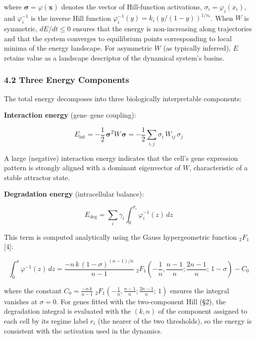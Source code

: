 \documentclass[11pt]{article}
\begin{document}
where $\boldsymbol{\sigma} = \varphi(\mathbf{x})$ denotes the vector of Hill-function activations, $\sigma_i = \varphi_i(x_i)$, and $\varphi_i^{-1}$ is the inverse Hill function $\varphi_i^{-1}(y) = k_i\left(y/(1-y)\right)^{1/n_i}$. When $W$ is symmetric, $dE/dt \leq 0$ ensures that the energy is non-increasing along trajectories and that the system converges to equilibrium points corresponding to local minima of the energy landscape. For asymmetric $W$ (as typically inferred), $E$ retains value as a landscape descriptor of the dynamical system's basins.


\subsubsection*{4.2 Three Energy Components}

The total energy decomposes into three biologically interpretable components:

\textbf{Interaction energy} (gene--gene coupling):

\begin{equation}
E_{\text{int}} = -\frac{1}{2}\,\boldsymbol{\sigma}^T W\,\boldsymbol{\sigma} = -\frac{1}{2}\sum_{i,j}\sigma_i\,W_{ij}\,\sigma_j 
\end{equation}


A large (negative) interaction energy indicates that the cell's gene expression pattern is strongly aligned with a dominant eigenvector of $W$, characteristic of a stable attractor state.

\textbf{Degradation energy} (intracellular balance):

\begin{equation}
E_{\text{deg}} = \sum_i \gamma_i \int_0^{\sigma_i} \varphi_i^{-1}(z)\,dz 
\end{equation}


This term is computed analytically using the Gauss hypergeometric function $_2F_1$ [4]:


\begin{equation}
\int_0^{\sigma} \varphi^{-1}(z)\,dz = \frac{-n\,k\,(1-\sigma)^{(n-1)/n}}{n-1}\;{}_2F_1\!\left(-\frac{1}{n},\frac{n-1}{n};\frac{2n-1}{n};\,1-\sigma\right) - C_0 
\end{equation}


where the constant $C_0 = \frac{-n\,k}{n-1}\;{}_2F_1\!\left(-\frac{1}{n},\frac{n-1}{n};\frac{2n-1}{n};\,1\right)$ ensures the integral vanishes at $\sigma = 0$. For genes fitted with the two-component Hill (§2), the degradation integral is evaluated with the $(k, n)$ of the component assigned to each cell by its regime label $r_i$ (the nearer of the two thresholds), so the energy is consistent with the activation used in the dynamics.
\end{document}

